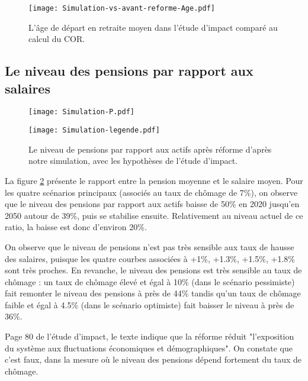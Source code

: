 \documentclass[10pt]{article}
\begin{document}
\begin{figure}
\begin{center}
\texttt{[image: Simulation-vs-avant-reforme-Age.pdf]}
\end{center}
\caption{L'âge de départ en retraite moyen dans l'étude d'impact comparé 
au calcul du COR.}
\label{fig-simulation-A-vs-COR}
\end{figure}



\subsection{Le niveau des pensions par rapport aux salaires}

\begin{figure}
\begin{center}
\texttt{[image: Simulation-P.pdf]}

\texttt{[image: Simulation-legende.pdf]}
\end{center}

\caption{Le niveau de pensions par rapport aux actifs après réforme 
d'après notre simulation, avec les hypothèses de l'étude d'impact.}
\label{fig-simulation-P}
\end{figure}

La figure \ref{fig-simulation-P} présente le rapport entre la pension moyenne et le salaire moyen. 
Pour les quatre scénarios principaux (associés au taux de chômage 
de 7\%), on observe que le niveau des pensions par rapport aux actifs 
baisse de 50\% en 2020 jusqu'en 2050 autour de 39\%, puis se stabilise ensuite. 
Relativement au niveau actuel de ce ratio, la baisse est donc d'environ 20\%. 

On observe que le niveau de pensions n'est pas très sensible 
aux taux de hausse des salaires, puisque les quatre courbes associées 
à +1\%, +1.3\%, +1.5\%,  +1.8\% sont très proches. 
En revanche, le niveau des pensions est très sensible au taux de chômage : 
un taux de chômage élevé et égal à 10\% (dans le scénario pessimiste) 
fait remonter le niveau des pensions à près de 44\% tandis qu'un taux de 
chômage faible et égal à 4.5\% (dans le scénario optimiste) fait baisser 
le niveau à près de 36\%. 

Page 80 de l'étude d'impact, le texte indique que la réforme 
réduit "l’exposition du système aux fluctuations économiques et démographiques". 
On constate que c'est faux, dans la mesure où le niveau des pensions 
dépend fortement du taux de chômage.
\end{document}
